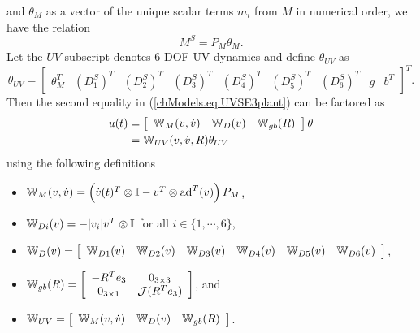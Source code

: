 %
and $\theta_M$ as
%
%
a vector of the unique scalar terms $m_i$ from $M$ in numerical order,
%
we have the relation 
%
\begin{equation}
M^S=P_M \theta_M.
\end{equation}
%
Let the $UV$ subscript denotes 6-\ac{DOF} \ac{UV} dynamics and define $\theta_{UV}$ as
%
\begin{equation}\label{chModels.eq.paramVecUV}
\theta_{UV}=\left[\begin{array}{cccccccccc}\theta_M^T&(D_1^S)^T&(D_2^S)^T&(D_3^S)^T
&(D_4^S)^T&(D_5^S)^T&(D_6^S)^T&g&b^T\end{array}\right]^T.
\end{equation}
%
Then the second equality in (\ref{chModels.eq.UVSE3plant}) can be factored as 
%
\begin{align}  
  u(t)&=\left[\begin{array}{ccc} \mathbb{W}_{M}(v,\dot{v})&\mathbb{W}_{D }(v)&\mathbb{W}_{gb}(R)\end{array}\right]\theta
\nonumber \\
      &=\mathbb{W}_{UV}(v,\dot{v},R)\theta_{UV}
\label{chModels.eq.UVSE3_LS} 
\end{align}
%
using the following definitions
%
\begin{itemize}
\item $\mathbb{W}_{M}(v,\dot{v})=\left(\dot{v}(t)^T \otimes \mathbb{I}-v^T\otimes \operatorname{ad}^T(v)\right)P_M$,
\item $\mathbb{W}_{D i}(v)=-|v_i|v^T \otimes \mathbb{I}$ for all $i \in \{1,\cdots,6\}$, 
\item $\mathbb{W}_{D }(v)=\left[\begin{array}{cccccc} \mathbb{W}_{D 1}(v)&\mathbb{W}_{D 2}(v)&\mathbb{W}_{D 3}(v)&\mathbb{W}_{D 4}(v)&\mathbb{W}_{D 5}(v)&\mathbb{W}_{D 6}(v)\end{array}\right]$,
\item $\mathbb{W}_{gb}(R)=\left[\begin{array}{cc} -R^Te_3 & 0_{3\times 3}\\ 
                                   0_{3 \times 1} & \mathcal{J}(R^T e_3)\end{array}\right]$, and 
\item $\mathbb{W}_{UV}=\left[\begin{array}{ccc} \mathbb{W}_{M}(v,\dot{v})&\mathbb{W}_{D }(v)&\mathbb{W}_{gb}(R)\end{array}\right]$.
\end{itemize}
%



